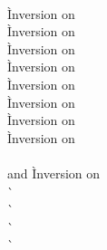 \begin{description}
\item[] \ \\
  \newcommand{\pushallocarraystack}{\frameexp{F}{\allocarrayexp{\tau_a}{\cdot}}}
  \begin{tabbing}
    \` Inversion on  \\
    \` Inversion on  \\
    \` Inversion on  \\
    \` Inversion on  \\
    \` Inversion on  \\
    \` Inversion on  \\
    \` Inversion on  \\
    \` Inversion on  \\
  \\
   and 
    \` Inversion on  \\
    \`  \\
    \`  \\
    \`  \\
    \`  \\

\end{tabbing}
\end{description}
